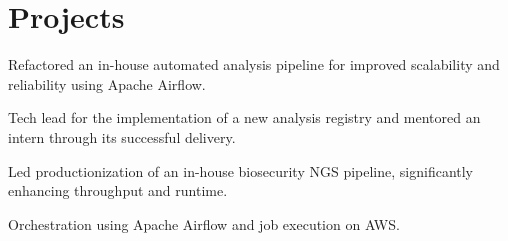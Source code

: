 \documentclass[]{resume}
\begin{document}
\begin{minipage}[t]{0.69\textwidth}


\section{Projects}


\vspace{\topsep} %
\begin{tightemize}
\item {Refactored an in-house automated analysis pipeline for improved scalability and reliability using Apache Airflow.}
\item {Tech lead for the implementation of a new analysis registry and mentored an intern through its successful delivery.}
\end{tightemize}
\sectionsep

\begin{tightemize}
\item {Led productionization of an in-house biosecurity NGS pipeline, significantly enhancing throughput and runtime.}
\item {Orchestration using Apache Airflow and job execution on AWS.}
\end{tightemize}
\sectionsep


\end{minipage}
\end{document}
